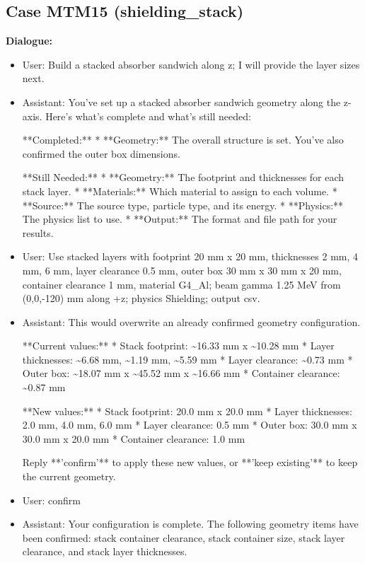 \documentclass[11pt]{ctexart}
\begin{document}
\subsection{Case MTM15 (shielding\_stack)}
\textbf{Dialogue:}
\begin{itemize}
\item User: Build a stacked absorber sandwich along z; I will provide the layer sizes next.
\item Assistant: You've set up a stacked absorber sandwich geometry along the z-axis. Here's what's complete and what's still needed:

**Completed:**
*   **Geometry:** The overall structure is set. You've also confirmed the outer box dimensions.

**Still Needed:**
*   **Geometry:** The footprint and thicknesses for each stack layer.
*   **Materials:** Which material to assign to each volume.
*   **Source:** The source type, particle type, and its energy.
*   **Physics:** The physics list to use.
*   **Output:** The format and file path for your results.
\item User: Use stacked layers with footprint 20 mm x 20 mm, thicknesses 2 mm, 4 mm, 6 mm, layer clearance 0.5 mm, outer box 30 mm x 30 mm x 20 mm, container clearance 1 mm, material G4\_Al; beam gamma 1.25 MeV from (0,0,-120) mm along +z; physics Shielding; output csv.
\item Assistant: This would overwrite an already confirmed geometry configuration.

**Current values:**
*   Stack footprint: \textasciitilde{}16.33 mm x \textasciitilde{}10.28 mm
*   Layer thicknesses: \textasciitilde{}6.68 mm, \textasciitilde{}1.19 mm, \textasciitilde{}5.59 mm
*   Layer clearance: \textasciitilde{}0.73 mm
*   Outer box: \textasciitilde{}18.07 mm x \textasciitilde{}45.52 mm x \textasciitilde{}16.66 mm
*   Container clearance: \textasciitilde{}0.87 mm

**New values:**
*   Stack footprint: 20.0 mm x 20.0 mm
*   Layer thicknesses: 2.0 mm, 4.0 mm, 6.0 mm
*   Layer clearance: 0.5 mm
*   Outer box: 30.0 mm x 30.0 mm x 20.0 mm
*   Container clearance: 1.0 mm

Reply **'confirm'** to apply these new values, or **'keep existing'** to keep the current geometry.
\item User: confirm
\item Assistant: Your configuration is complete. The following geometry items have been confirmed: stack container clearance, stack container size, stack layer clearance, and stack layer thicknesses.
\end{itemize}
\end{document}

